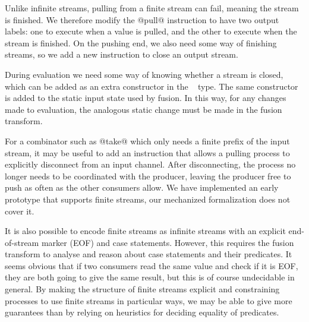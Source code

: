 Unlike infinite streams, pulling from a finite stream can fail, meaning the stream is finished. We therefore modify the @pull@ instruction to have two output labels: one to execute when a value is pulled, and the other to execute when the stream is finished. On the pushing end, we also need some way of finishing streams, so we add a new instruction to close an output stream.

During evaluation we need some way of knowing whether a stream is closed, which can be added as an extra constructor in the \InputState~ type. The same constructor is added to the static input state used by fusion. In this way, for any changes made to evaluation, the analogous static change must be made in the fusion transform.

For a combinator such as @take@ which only needs a finite prefix of the input stream, it may be useful to add an instruction that allows a pulling process to explicitly disconnect from an input channel. After disconnecting, the process no longer needs to be coordinated with the producer, leaving the producer free to push as often as the other consumers allow. We have implemented an early prototype that supports finite streams, our mechanized formalization does not cover it.

It is also possible to encode finite streams as infinite streams with an explicit end-of-stream marker (EOF) and case statements. However, this requires the fusion transform to analyse and reason about case statements and their predicates. It seems obvious that if two consumers read the same value and check if it is EOF, they are both going to give the same result, but this is of course undecidable in general. By making the structure of finite streams explicit and constraining processes to use finite streams in particular ways, we may be able to give more guarantees than by relying on heuristics for deciding equality of predicates. 

